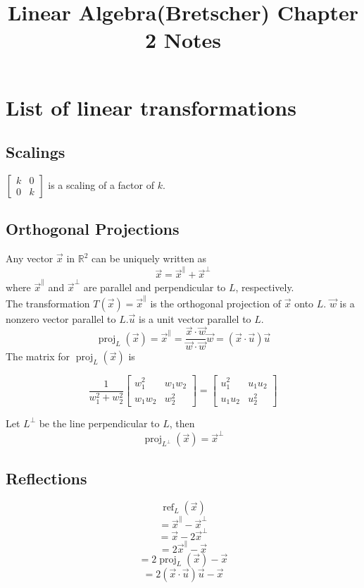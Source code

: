 \documentclass[letter]{article}
\title{Linear Algebra(Bretscher) Chapter 2 Notes}
\date{}
\newcommand{\R}{\mathbb{R}}
\newcommand{\proj}{\operatorname{proj}}
\begin{document}
\maketitle
\vspace{-.5in}
\section{List of linear transformations}
\subsection{Scalings}
$\begin{bmatrix}
k&0\\
0&k
\end{bmatrix}$ is a scaling of a factor of $k$.

\subsection{Orthogonal Projections}
Any vector $\vec x$ in $\R^2$ can be uniquely written as
\[
\vec x = \vec x^\parallel + \vec x^\perp
\]
where $\vec x^\parallel$ and $\vec x^\perp$ are parallel and perpendicular to $L$, respectively.\\
The transformation $T(\vec x) =  \vec x^\parallel$ is the orthogonal projection of $\vec x$ onto $L$.
$\vec w$ is a nonzero vector parallel to $L$.$\vec u$ is a unit vector parallel to $L$.
\[\proj_L(\vec x) = \vec x^\parallel =  \frac{\vec x \cdot \vec w}{\vec w \cdot \vec w} \vec w = (\vec x \cdot \vec u) \vec u\]
The matrix for $\proj_L(\vec x)$ is

\[\frac{1}{w_1^2+w_2^2}
\begin{bmatrix}
w_1^2&w_1w_2\\
w_1w_2&w_2^2
\end{bmatrix} = \begin{bmatrix}
u_1^2&u_1u_2\\
u_1u_2&u_2^2
\end{bmatrix}
\]

Let $L^\perp$ be the line perpendicular to $L$, then \[\proj_{L^\perp}(\vec x) = \vec x^\perp \]
\subsection{Reflections}


\[\operatorname{ref}_L(\vec x) \]
\[=  \vec x^\parallel - \vec x^\perp\]
\[= \vec x - 2\vec x^\perp\]
\[= 2 \vec x^\parallel - \vec x\]
\[= 2 \proj_L(\vec x) - \vec x\]
\[= 2(\vec x \cdot \vec u)\vec u - \vec x\]
\end{document}
